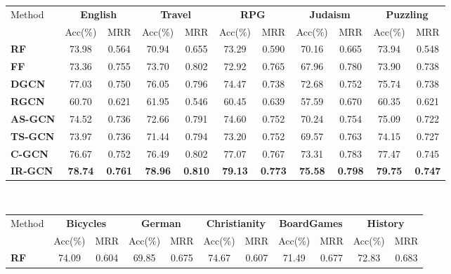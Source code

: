 \documentclass[smallcondensed]{svjour3}     %
\begin{document}
\begin{table}[h]
  \centering
  \begin{tabular}{l|c c|c c|c c|c c|c c}
     \toprule
     \multirow{2}{*}{Method} &
        \multicolumn{2}{c}{\textbf{English}} &
       \multicolumn{2}{c}{\textbf{Travel}} &
       \multicolumn{2}{c}{\textbf{RPG}} &
       \multicolumn{2}{c}{\textbf{Judaism}} &
       \multicolumn{2}{c}{\textbf{Puzzling}}\\
       &{Acc(\%)} & {MRR}&{Acc(\%)} & {MRR}&{Acc(\%)}& {MRR}&{Acc(\%)} & {MRR}&{Acc(\%)} & {MRR}\\
       \midrule
         \textbf{RF~\cite{BurelMA16,TianZL13}}&73.98&0.564&70.94&0.655&73.29&0.590&70.16&0.665&73.94&0.548\\
          \textbf{FF~\cite{JendersKN16}}&73.36&0.755&73.70&0.802&72.92&0.765&67.96&0.780&73.90&0.738\\
          \textbf{DGCN~\cite{DualGCN}}&77.03&0.750&76.05&0.796&74.47&0.738&72.68&0.752&75.74&0.738\\
          \textbf{RGCN~\cite{relationalGCN}}&60.70&0.621&61.95&0.546&60.45&0.639&57.59&0.670&60.35&0.621\\
          \cmidrule(lr){1-1}\cmidrule(lr){2-11}
          \textbf{AS-GCN}&74.52&0.736&72.66&0.791&74.60&0.752&70.24&0.754&75.09&0.722\\
          \textbf{TS-GCN}&73.97&0.736&71.44&0.794&73.20&0.752&69.57&0.763&74.15&0.727\\
          \textbf{C-GCN}&76.67&0.752&76.49&0.802&77.07&0.767&73.31&0.783&77.47&0.745\\
          \textbf{IR-GCN}&\textbf{78.74}&\textbf{0.761}&\textbf{78.96}&\textbf{0.810}&\textbf{79.13}&\textbf{0.773}&\textbf{75.58}&\textbf{0.798}&\textbf{79.75}&\textbf{0.747}\\

     \bottomrule
   \end{tabular}\\
   \begin{tabular}{l|c c|c c|c c|c c|c c}
      \toprule
      \multirow{2}{*}{Method} &
         \multicolumn{2}{c}{\textbf{Bicycles}} &
        \multicolumn{2}{c}{\textbf{German}} &
        \multicolumn{2}{c}{\textbf{Christianity}} &
        \multicolumn{2}{c}{\textbf{BoardGames}} &
        \multicolumn{2}{c}{\textbf{History}}\\
        &{Acc(\%)} & {MRR}&{Acc(\%)} & {MRR}&{Acc(\%)}& {MRR}&{Acc(\%)} & {MRR}&{Acc(\%)} & {MRR}\\
        \midrule
        \textbf{RF~\cite{BurelMA16,TianZL13}}&74.09&0.604&69.85&0.675&74.67&0.607&71.49&0.677&72.83&0.683\\


\end{tabular}
\end{table}
\end{document}
